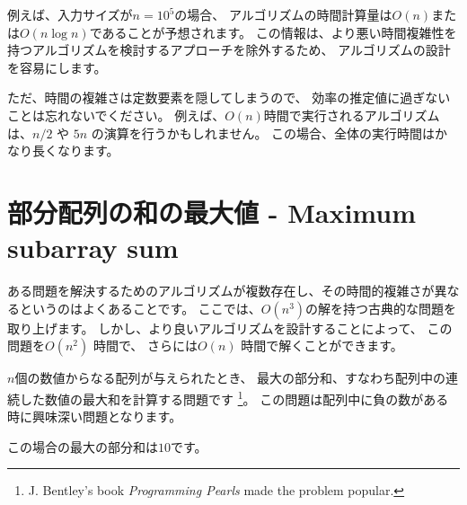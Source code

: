 例えば、入力サイズが$n=10^5$の場合、
アルゴリズムの時間計算量は$O(n)$また は$O(n \log n)$であることが予想されます。
この情報は、より悪い時間複雑性を持つアルゴリズムを検討するアプローチを除外するため、
アルゴリズムの設計を容易にします。


ただ、時間の複雑さは定数要素を隠してしまうので、
効率の推定値に過ぎないことは忘れないでください。
例えば、$O(n)$時間で実行されるアルゴリズムは、$n/2$ や $5n$
の演算を行うかもしれません。
この場合、全体の実行時間はかなり長くなります。

\section{部分配列の和の最大値 - Maximum subarray sum}


ある問題を解決するためのアルゴリズムが複数存在し、その時間的複雑さが異なるというのはよくあることです。
ここでは、$O(n^3)$の解を持つ古典的な問題を取り上げます。
しかし、より良いアルゴリズムを設計することによって、
この問題を$O(n^2)$ 時間で、
さらには$O(n)$ 時間で解くことができます。

$n$個の数値からなる配列が与えられたとき、
最大の部分和、すなわち配列中の連続した数値の最大和を計算する問題です
\footnote{J. Bentley's
book \emph{Programming Pearls} \cite{ben86} made the problem popular.}。
この問題は配列中に負の数がある時に興味深い問題となります。

\begin{center}
\end{center}
\begin{samepage}
この場合の最大の部分和は$10$です。
\begin{center}
\end{center}
\end{samepage}

